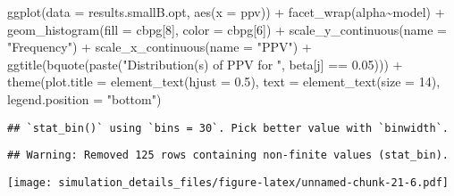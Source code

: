 \documentclass[
]{article}
\newenvironment{Shaded}{\begin{snugshade}}{\end{snugshade}}
\newcommand{\AttributeTok}[1]{\textcolor[rgb]{0.77,0.63,0.00}{#1}}
\newcommand{\DecValTok}[1]{\textcolor[rgb]{0.00,0.00,0.81}{#1}}
\newcommand{\FloatTok}[1]{\textcolor[rgb]{0.00,0.00,0.81}{#1}}
\newcommand{\FunctionTok}[1]{\textcolor[rgb]{0.00,0.00,0.00}{#1}}
\newcommand{\NormalTok}[1]{#1}
\newcommand{\SpecialCharTok}[1]{\textcolor[rgb]{0.00,0.00,0.00}{#1}}
\newcommand{\StringTok}[1]{\textcolor[rgb]{0.31,0.60,0.02}{#1}}
\begin{document}
\begin{Shaded}
\begin{Highlighting}[]
\FunctionTok{ggplot}\NormalTok{(}\AttributeTok{data =}\NormalTok{ results.smallB.opt,}
       \FunctionTok{aes}\NormalTok{(}\AttributeTok{x =}\NormalTok{ ppv)) }\SpecialCharTok{+}
  \FunctionTok{facet\_wrap}\NormalTok{(alpha}\SpecialCharTok{\textasciitilde{}}\NormalTok{model) }\SpecialCharTok{+}
  \FunctionTok{geom\_histogram}\NormalTok{(}\AttributeTok{fill =}\NormalTok{ cbpg[}\DecValTok{8}\NormalTok{], }\AttributeTok{color =}\NormalTok{ cbpg[}\DecValTok{6}\NormalTok{]) }\SpecialCharTok{+}
  \FunctionTok{scale\_y\_continuous}\NormalTok{(}\AttributeTok{name =} \StringTok{"Frequency"}\NormalTok{) }\SpecialCharTok{+}
  \FunctionTok{scale\_x\_continuous}\NormalTok{(}\AttributeTok{name =} \StringTok{"PPV"}\NormalTok{) }\SpecialCharTok{+}
  \FunctionTok{ggtitle}\NormalTok{(}\FunctionTok{bquote}\NormalTok{(}\FunctionTok{paste}\NormalTok{(}\StringTok{"Distribution(s) of PPV for "}\NormalTok{, beta[j] }\SpecialCharTok{==} \FloatTok{0.05}\NormalTok{))) }\SpecialCharTok{+}
  \FunctionTok{theme}\NormalTok{(}\AttributeTok{plot.title =} \FunctionTok{element\_text}\NormalTok{(}\AttributeTok{hjust =} \FloatTok{0.5}\NormalTok{), }
        \AttributeTok{text =} \FunctionTok{element\_text}\NormalTok{(}\AttributeTok{size =} \DecValTok{14}\NormalTok{),}
        \AttributeTok{legend.position =} \StringTok{"bottom"}\NormalTok{)}
\end{Highlighting}
\end{Shaded}

\begin{verbatim}
## `stat_bin()` using `bins = 30`. Pick better value with `binwidth`.
\end{verbatim}

\begin{verbatim}
## Warning: Removed 125 rows containing non-finite values (stat_bin).
\end{verbatim}

\texttt{[image: simulation\_details\_files/figure-latex/unnamed-chunk-21-6.pdf]}
\end{document}
